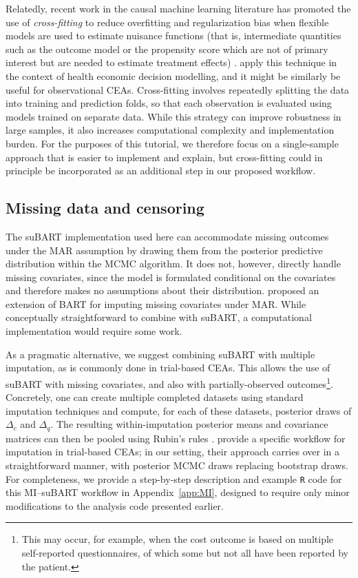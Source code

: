 \documentclass[aoas,preprint]{imsart}
\theoremstyle{plain}
\theoremstyle{definition}
\theoremstyle{remark}
\theoremstyle{remark}
\begin{document}
Relatedly, recent work in the causal machine learning literature has promoted the use of \emph{cross-fitting} to reduce overfitting and regularization bias when flexible models are used to estimate nuisance functions (that is, intermediate quantities such as the outcome model or the propensity score which are not of primary interest but are needed to estimate treatment effects) \citep{Chernozhukov2018}. \citet{Glynn2024} apply this technique in the context of health economic decision modelling, and it might be similarly be useful for observational CEAs.
Cross-fitting involves repeatedly splitting the data into training and prediction folds, so that each observation is evaluated using models trained on separate data. While this strategy can improve robustness in large samples, it also increases computational complexity and implementation burden. For the purposes of this tutorial, we therefore focus on a single-sample approach that is easier to implement and explain, but cross-fitting could in principle be incorporated as an additional step in our proposed workflow.


\subsection{Missing data and censoring}
The suBART implementation used here can accommodate missing outcomes under the MAR assumption by drawing them from the posterior predictive distribution within the MCMC algorithm. It does not, however, directly handle missing covariates, since the model is formulated conditional on the covariates and therefore makes no assumptions about their distribution. \citet{xu2016sequential} proposed an extension of BART for imputing missing covariates under MAR. While conceptually straightforward to combine with suBART, a computational implementation would require some work.

As a pragmatic alternative, we suggest combining suBART with multiple imputation, as is commonly done in trial-based CEAs. This allows the use of suBART with missing covariates, and also with partially-observed outcomes\footnote{This may occur, for example, when the cost outcome is based on multiple self-reported questionnaires, of which some but not all have been reported by the patient.}. Concretely, one can create multiple completed datasets using standard imputation techniques and compute, for each of these datasets, posterior draws of $\Delta_c$ and $\Delta_q$. The resulting within-imputation posterior means and covariance matrices can then be pooled using Rubin's rules \citep{rubin2018multiple}. \citet{ben2023conducting} provide a specific workflow for imputation in trial-based CEAs; in our setting, their approach carries over in a straightforward manner, with posterior MCMC draws replacing bootstrap draws. For completeness, we provide a step-by-step description and example \texttt{R} code for this MI--suBART workflow in Appendix~\ref{app:MI}, designed to require only minor modifications to the analysis code presented earlier.
\end{document}
